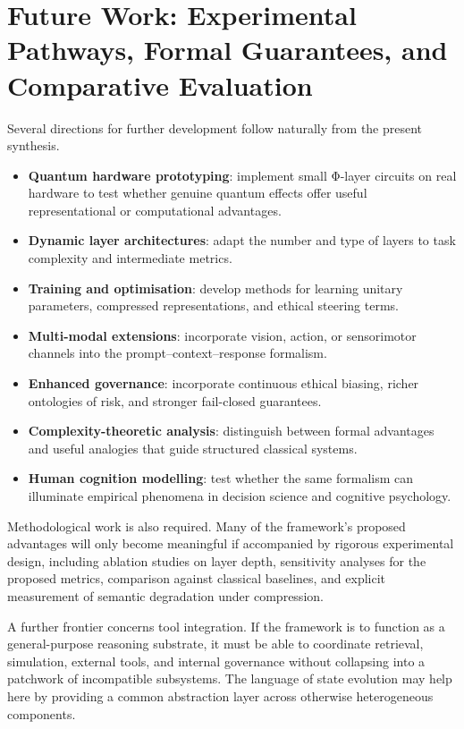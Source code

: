 \documentclass[12pt]{article}
\begin{document}
\section{Future Work: Experimental Pathways, Formal Guarantees, and Comparative Evaluation}\label{sec:future-work}
Several directions for further development follow naturally from the present synthesis.
\begin{itemize}[leftmargin=2em]
    \item \textbf{Quantum hardware prototyping}: implement small Φ-layer circuits on real hardware to test whether genuine quantum effects offer useful representational or computational advantages.
    \item \textbf{Dynamic layer architectures}: adapt the number and type of layers to task complexity and intermediate metrics.
    \item \textbf{Training and optimisation}: develop methods for learning unitary parameters, compressed representations, and ethical steering terms.
    \item \textbf{Multi-modal extensions}: incorporate vision, action, or sensorimotor channels into the prompt--context--response formalism.
    \item \textbf{Enhanced governance}: incorporate continuous ethical biasing, richer ontologies of risk, and stronger fail-closed guarantees.
    \item \textbf{Complexity-theoretic analysis}: distinguish between formal advantages and useful analogies that guide structured classical systems.
    \item \textbf{Human cognition modelling}: test whether the same formalism can illuminate empirical phenomena in decision science and cognitive psychology.
\end{itemize}

Methodological work is also required. Many of the framework's proposed advantages will only become meaningful if accompanied by rigorous experimental design, including ablation studies on layer depth, sensitivity analyses for the proposed metrics, comparison against classical baselines, and explicit measurement of semantic degradation under compression.

A further frontier concerns tool integration. If the framework is to function as a general-purpose reasoning substrate, it must be able to coordinate retrieval, simulation, external tools, and internal governance without collapsing into a patchwork of incompatible subsystems. The language of state evolution may help here by providing a common abstraction layer across otherwise heterogeneous components.
\end{document}
